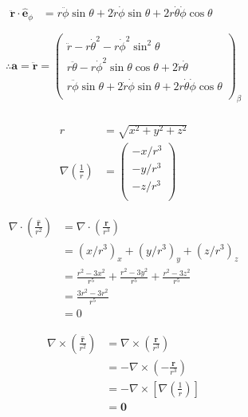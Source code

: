 \documentclass[12pt]{article}
\newenvironment{problem}[2][Problem]{\begin{trivlist}
\item[\hskip \labelsep {\bfseries #1}\hskip \labelsep {\bfseries #2.}]}{\end{trivlist}}
\begin{document}
\begin{gather*}
\begin{aligned}
		\ddot{\mathbf{r}} \cdot \hat{\mathbf{e}}_\phi &= 
			r\ddot{\phi}\sin\theta + 2\dot{r}\dot{\phi}\sin\theta
			+ 2r\dot{\theta}\dot{\phi}\cos\theta \\
	\end{aligned} \\
	\therefore \mathbf{a} = \ddot{\mathbf{r}} = \left( \begin{array}{c}
			\ddot{r} - r\dot{\theta}^2 - r\dot{\phi}^2\sin^2\theta \\
			r\ddot{\theta} - r\dot{\phi}^2\sin\theta\cos\theta +
				2\dot{r}\dot{\theta} \\
			r\ddot{\phi}\sin\theta + 2\dot{r}\dot{\phi}\sin\theta
			+ 2r\dot{\theta}\dot{\phi}\cos\theta \\
		\end{array} \right)_\beta \\
\end{gather*}

\begin{problem}{3.a}
\end{problem}
\begin{align*}
	r &= \sqrt{x^2 + y^2 + z^2} \\
	\nabla \left( \frac{1}{r} \right) &= \left( \begin{array}{c}
			- x/r^3 \\
			- y/r^3 \\
			- z/r^3 \\
		\end{array} \right)
\end{align*}

\begin{problem}{3.b}
\end{problem}
\begin{align*}
	\nabla \cdot \left( \frac{\hat{\mathbf{r}}}{r^2} \right) &= 
		\nabla \cdot \left( \frac{\mathbf{r}}{r^3} \right) \\
	&= ( x/r^3 )_x + ( y/r^3 )_y + ( z/r^3 )_z \\
	&= \frac{r^2 - 3x^2}{r^5} + \frac{r^2 - 3y^2}{r^5} + \frac{r^2 - 3z^2}{r^5} \\
	&= \frac{3r^2-3r^2}{r^5} \\
	&= 0
\end{align*}

\begin{problem}{3.c}
\end{problem}
\begin{align*}
	\nabla \times \left( \frac{\hat{\mathbf{r}}}{r^2} \right) &= 
		\nabla \times \left( \frac{\mathbf{r}}{r^3} \right) \\
	&= -\nabla \times \left( -\frac{\mathbf{r}}{r^3} \right) \\
	&= -\nabla \times \left[ \nabla \left( \frac{1}{r} \right) \right] \\
	&= \mathbf{0}
\end{align*}
\end{document}
